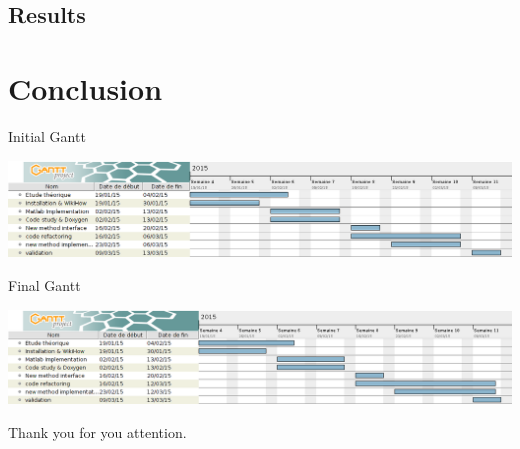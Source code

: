 \documentclass[10p]{beamer}
\newenvironment{changemargin}[2]{%
\begin{list}{}{%
\setlength{\topsep}{0pt}%
\setlength{\leftmargin}{#1}%
\setlength{\rightmargin}{#2}%
\setlength{\listparindent}{\parindent}%
\setlength{\itemindent}{\parindent}%
\setlength{\parsep}{\parskip}%
}%
\item[]}{\end{list}}
\begin{document}
\subsection{Results}
\begin{frame}

\end{frame}
\section{Conclusion}
\begin{frame}
\begin{itemize}
\item Initial Gantt
\begin{changemargin}{-1.2cm}{0cm}
\includegraphics[width=1.1\textwidth]{Image/gantt.png}
\end{changemargin}
\item Final Gantt
\begin{changemargin}{-1.2cm}{0cm}
\includegraphics[width=1.1\textwidth]{Image/gantt2.png}
\end{changemargin}
\end{itemize}
\end{frame}
\begin{frame}
\huge
\begin{center}
Thank you for you attention.
\end{center}
\end{frame}
\end{document}
